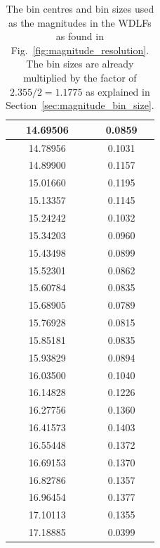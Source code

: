 \documentclass[fleqn,usenatbib]{mnras}
\begin{document}
\begin{table}
\begin{tabular}{c|c}
        14.69506 & 0.0859 \\\hline
        14.78956 & 0.1031 \\
        14.89900 & 0.1157 \\
        15.01660 & 0.1195 \\
        15.13357 & 0.1145 \\
        15.24242 & 0.1032 \\\hline
        15.34203 & 0.0960 \\
        15.43498 & 0.0899 \\
        15.52301 & 0.0862 \\
        15.60784 & 0.0835 \\
        15.68905 & 0.0789 \\\hline
        15.76928 & 0.0815 \\
        15.85181 & 0.0835 \\
        15.93829 & 0.0894 \\
        16.03500 & 0.1040 \\
        16.14828 & 0.1226 \\\hline
        16.27756 & 0.1360 \\
        16.41573 & 0.1403 \\
        16.55448 & 0.1372 \\
        16.69153 & 0.1370 \\
        16.82786 & 0.1357 \\\hline
        16.96454 & 0.1377 \\
        17.10113 & 0.1355 \\
        17.18885 & 0.0399
    \end{tabular}
    \caption{The bin centres and bin sizes used as the magnitudes in the WDLFs
    as found in Fig.~\ref{fig:magnitude_resolution}. The bin sizes are already 
    multiplied by the factor of $2.355 /2 = 1.1775$ as explained in Section~\ref{sec:magnitude_bin_size}.}
    \label{tab:magnitude_resolution}
\end{table}

\end{document}
